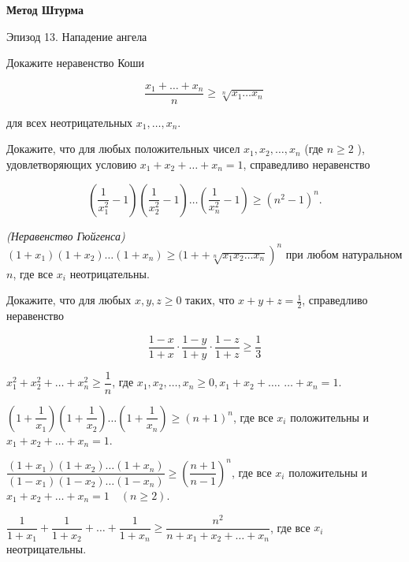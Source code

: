 \centerline{\bf \Huge Метод Штурма}

\begin{flushright}
        \scriptsize{Эпизод 13. Нападение ангела}
\end{flushright}

Докажите неравенство Коши

$$
\dfrac{x_1+\ldots+x_n}{n} \geq \sqrt[n]{x_1 \ldots x_n}
$$


для всех неотрицательных $x_1, \ldots, x_n$.

Докажите, что для любых положительных чисел $x_1, x_2, \ldots, x_n$ (где $n \geq 2$ ), удовлетворяющих условию $x_1+x_2+\ldots+x_n=1$, справедливо неравенство

$$
\left(\dfrac{1}{x_1^2}-1\right)\left(\dfrac{1}{x_2^2}-1\right) \ldots\left(\dfrac{1}{x_n^2}-1\right) \geq\left(n^2-1\right)^n .
$$

\textit{(Неравенство Гюйгенса)} $\left(1+x_1\right)\left(1+x_2\right) \ldots\left(1+x_n\right) \geq(1+ \left.+\sqrt[n]{x_1 x_2 \ldots x_n}\right)^n$ при любом натуральном $n$, где все $x_i$ неотрицательны.

Докажите, что для любых $x, y, z \geq 0$ таких, что $x+y+z=\frac{1}{2}$, справедливо неравенство

$$
\frac{1-x}{1+x} \cdot \frac{1-y}{1+y} \cdot \frac{1-z}{1+z} \geq \frac{1}{3}
$$

 $x_1^2+x_2^2+\ldots+x_n^2 \geq \dfrac{1}{n}$, где $x_1, x_2, \ldots, x_n \geq 0, x_1+x_2+\ldots$. $\ldots+x_n=1$.

$\left(1+\dfrac{1}{x_1}\right)\left(1+\dfrac{1}{x_2}\right) \ldots\left(1+\dfrac{1}{x_n}\right) \geq(n+1)^n$, где все $x_i$ положительны и $x_1+x_2+\ldots+x_n=1$.

$\dfrac{\left(1+x_1\right)\left(1+x_2\right) \ldots\left(1+x_n\right)}{\left(1-x_1\right)\left(1-x_2\right) \ldots\left(1-x_n\right)} \geq\left(\dfrac{n+1}{n-1}\right)^n$, где все $x_i$ положительны и $x_1+x_2+\ldots+x_n=1 \quad(n \geq 2)$.

$\dfrac{1}{1+x_1}+\dfrac{1}{1+x_2}+\ldots+\dfrac{1}{1+x_n} \geq \dfrac{n^2}{n+x_1+x_2+\ldots+x_n}$,  где все $x_i$ неотрицательны.